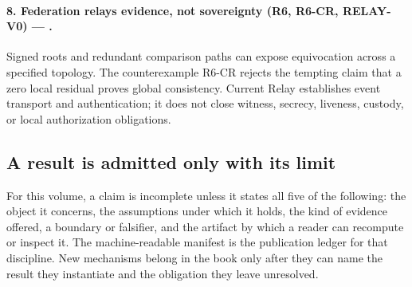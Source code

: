 \paragraph{8. Federation relays evidence, not sovereignty (R6, R6-CR,
RELAY-V0) --- .}
Signed roots and redundant comparison paths can expose equivocation across a
specified topology. The counterexample R6-CR rejects the tempting claim that a
zero local residual proves global consistency. Current Relay establishes event
transport and authentication; it does not close witness, secrecy, liveness,
custody, or local authorization obligations.

\subsection{A result is admitted only with its limit}
For this volume, a claim is incomplete unless it states all five of the
following: the object it concerns, the assumptions under which it holds, the
kind of evidence offered, a boundary or falsifier, and the artifact by which a
reader can recompute or inspect it. The machine-readable manifest is the
publication ledger for that discipline. New mechanisms belong in the book only
after they can name the result they instantiate and the obligation they leave
unresolved.

